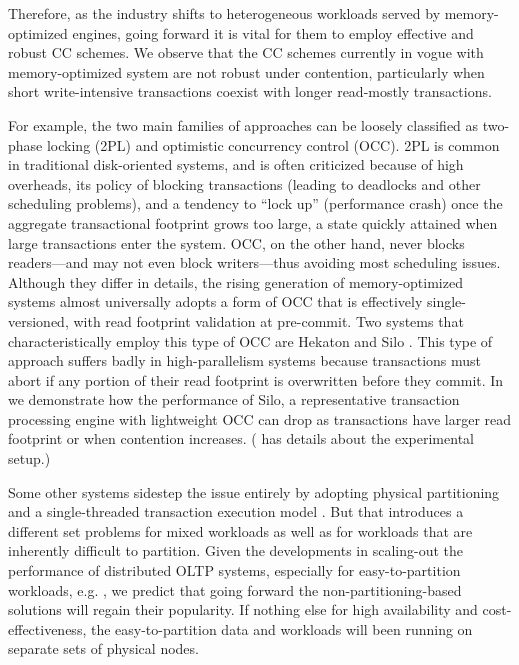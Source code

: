 Therefore, as the industry shifts to heterogeneous workloads served by memory-optimized engines, going forward it is vital for them to employ effective and robust CC schemes. 
We observe that the CC schemes currently in vogue with memory-optimized system are not robust under contention, particularly when short write-intensive transactions coexist with longer read-mostly transactions.

For example, the two main families of approaches can be loosely classified as two-phase locking (2PL) and optimistic concurrency control (OCC). 2PL is common in traditional disk-oriented systems, and is often criticized because of high overheads, its policy of blocking transactions (leading to deadlocks and other scheduling problems), and a tendency to ``lock up'' (performance crash) once the aggregate transactional footprint grows too large, a state quickly attained when large transactions enter the system. OCC, on the other hand, never blocks readers---and may not even block writers---thus avoiding most scheduling issues. Although they differ in details, the rising generation of memory-optimized systems almost universally adopts a form of OCC that is effectively single-versioned, with read footprint validation at pre-commit.  Two systems that characteristically employ this type of OCC are Hekaton \cite{LarsonBDFPZ11} and Silo \cite{TuZKLM13}. This type of approach suffers badly in high-parallelism systems \cite{YuBPDS14} because transactions must abort if any portion of their read footprint is overwritten before they commit. 
In  we demonstrate how the performance of Silo, a representative transaction processing engine with lightweight OCC can drop as transactions have larger read footprint or when contention increases. ( has details about the experimental setup.) 

Some other systems sidestep the issue entirely by adopting physical partitioning and a single-threaded transaction execution model \cite{Kallman+08,KemperN11}. But that introduces a different set problems for mixed workloads as well as for workloads that are inherently difficult to partition.  Given the developments in scaling-out the performance of distributed OLTP systems, especially for easy-to-partition workloads, e.g. \cite{Corbett+12,BailisFHGS14,ThomsonA10}, we predict that going forward the non-partitioning-based solutions will regain their popularity.
If nothing else for high availability and cost-effectiveness, the easy-to-partition data and workloads will been running on separate sets of physical nodes.

